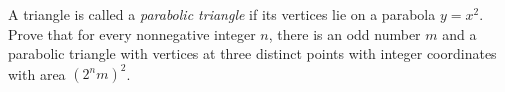 A triangle is called a \emph{parabolic triangle} if its vertices lie on a parabola $y=x^2$. Prove that for every nonnegative integer $n$, there is an odd number $m$ and a parabolic triangle with vertices at three distinct points with integer coordinates with area $\left(2^nm\right)^2$.